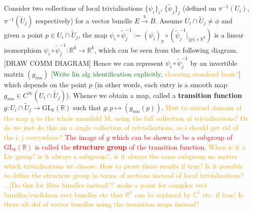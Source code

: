 \documentclass[a4paper]{article}
\theoremstyle{definition} \newtheorem*{definition}{Definition}
\theoremstyle{definition} \newtheorem*{definitions}{Definitions}
\theoremstyle{plain} \newtheorem{theorem}{Theorem}[section]
\theoremstyle{plain} \newtheorem{proposition}[theorem]{Proposition}
\theoremstyle{plain} \newtheorem{corollary}[theorem]{Corollary}
\theoremstyle{plain} \newtheorem{lemma}[theorem]{Lemma}
\theoremstyle{plain} \newtheorem{example}[theorem]{Example}
\newcommand{\checkCorrect}[1]{\textcolor{red}{#1}}
\newcommand{\question}[1]{\textcolor{orange}{#1}}
\newcommand{\finish}[1]{\textcolor{green}{#1}}
\newcommand{\defn}[1]{\textbf{#1}}
\newcommand{\realnos}{\mathbb{R}}
\newcommand{\complexnos}{\mathbb{C}}
\begin{document}
Consider two collections of local trivialisations $\{\psi_i \}_i$, $\{\tilde{\psi}_j\}_j$ (defined on $\pi^{-1}(U_i)$, $\pi^{-1}(\tilde{U}_j)$ respectively) 
for a vector bundle $E\xrightarrow{\pi} B$. Assume $U_i \cap \tilde{U}_j\neq \phi$ and given a 
point $p\in U_i \cap \tilde{U}_j$, the map $\psi_i \circ \tilde{\psi}_j^{-1}:=(\psi_i)_p \circ (\tilde{\psi}_j^{-1}\vert_{\{p\}\times \realnos^k})$ 
is a linear isomorphism $\psi_i \circ \tilde{\psi}_j^{-1} : \realnos^k \rightarrow \realnos^k$, 
which can be seen from the following diagram.
[DRAW COMM DIAGRAM]
Hence we can represent $\psi_i \circ \tilde{\psi}_j^{-1}$ by an invertible matrix $(g_{mn})$ \finish{[Write lin alg identification explicitly, \question{choosing standard basis?}]} which depends on the point $p$ (in other words, each entry is a smooth map $g_{mn}\in C^\infty(U_i\cap \tilde{U}_j)$). Whence we obtain a map, called a \defn{transition function}
$g:U_i\cap \tilde{U}_j\rightarrow \mathrm{GL}_k(\realnos)$ such that $g:p\mapsto (g_{mn}(p))$. \question{How to extend domain of the map g to the whole manifold M, using the full collection of trivialisations? Or do we just do this on a single collection of trivialisations, so i should get rid of the i, j everywhere?} \checkCorrect{The image of $g$ which can be shown to be a subgroup of $\mathrm{GL}_k(\realnos)$ is called the \defn{structure group} of the transition function.} \question{When is it a Lie group? is it always a subgroup?, is it always the same subgroup no matter which trivialisations we choose. How to prove these results if true?} \question{Is it possible to define the structrue group in terms of sections instead of local trivialisations?}
\question{...[Do this for fibre bundles instead?? make a point for complex vect bundles/euclidean vect bundles etc that $\realnos^k$ can be replaced by $\complexnos^k$ etc. if true]}
\question{Is there alt def of vector bundles using the tranistion maps instead?}
\end{document}
